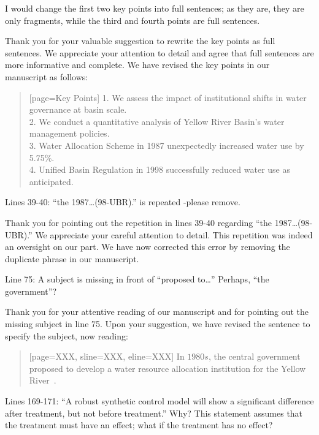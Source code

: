 \RC{} I would change the first two key points into full sentences; as they are, they are only fragments, while the third and fourth points are full sentences.

\AR{} Thank you for your valuable suggestion to rewrite the key points as full sentences. We appreciate your attention to detail and agree that full sentences are more informative and complete. We have revised the key points in our manuscript as follows:

\begin{quote}[page=Key Points]
    1.	We assess the impact of institutional shifts in water governance at basin scale.\\
    2.	We conduct a quantitative analysis of Yellow River Basin's water management policies.\\
    3.	Water Allocation Scheme in 1987 unexpectedly increased water use by 5.75\%.\\
    4.	Unified Basin Regulation in 1998 successfully reduced water use as anticipated.\\
\end{quote}

\RC{} Lines 39-40: ``the 1987\ldots (98-UBR).'' is repeated -please remove.

\AR{} Thank you for pointing out the repetition in lines 39-40 regarding ``the 1987\ldots (98-UBR).'' We appreciate your careful attention to detail. This repetition was indeed an oversight on our part. We have now corrected this error by removing the duplicate phrase in our manuscript.

\RC{} Line 75: A subject is missing in front of ``proposed to\ldots '' Perhaps, ``the government''?

\AR{} Thank you for your attentive reading of our manuscript and for pointing out the missing subject in line 75. Upon your suggestion, we have revised the sentence to specify the subject, now reading:

\begin{quote}[page=XXX, sline=XXX, eline=XXX]
    In $1980s$, the central government proposed to develop a water resource allocation institution for the Yellow River~\cite{wang2019d, wang2019e}.
\end{quote}

\RC{} Lines 169-171: ``A robust synthetic control model will show a significant difference after treatment, but not before treatment.'' Why? This statement assumes that the treatment must have an effect; what if the treatment has no effect?

